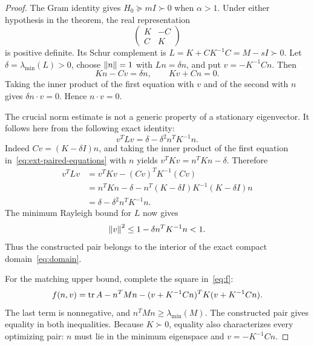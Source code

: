 \begin{proof}
The Gram identity gives $H_0\succeq mI\succ0$ when $\alpha>1$.
Under either hypothesis in the theorem, the real representation
\[
 \begin{pmatrix}K&-C\\ C&K\end{pmatrix}
\]
is positive definite. Its Schur complement is
$L=K+CK^{-1}C=M-sI\succ0$. Let
$\delta=\lambda_{\min}(L)>0$, choose $\left\lVert n\right\rVert=1$ with $Ln=\delta n$,
and put $v=-K^{-1}Cn$. Then
\begin{equation}
 Kn-Cv=\delta n,\qquad Kv+Cn=0.
 \label{eq:ext-paired-equations}
\end{equation}
Taking the inner product of the first equation with $v$ and of the
second with $n$ gives $\delta n\cdot v=0$. Hence $n\cdot v=0$.

The crucial norm estimate is not a generic property of a stationary
eigenvector. It follows here from the following exact identity:
\begin{equation}
 \boxed{\,v^TLv=\delta-\delta^2n^TK^{-1}n.\,}
 \label{eq:ext-rayleigh-identity}
\end{equation}
Indeed $Cv=(K-\delta I)n$, and taking the inner product of the
first equation in~\eqref{eq:ext-paired-equations} with $n$ yields
$v^TKv=n^TKn-\delta$. Therefore
\begin{align*}
 v^TLv
 &=v^TKv-(Cv)^TK^{-1}(Cv)\\
 &=n^TKn-\delta
   -n^T(K-\delta I)K^{-1}(K-\delta I)n\\
 &=\delta-\delta^2n^TK^{-1}n.
\end{align*}
The minimum Rayleigh bound for $L$ now gives
\begin{equation}
 \left\lVert v\right\rVert^2\le1-\delta n^TK^{-1}n<1.
 \label{eq:ext-feasible-margin}
\end{equation}
Thus the constructed pair belongs to the interior of the exact compact
domain~\eqref{eq:domain}.

For the matching upper bound, complete the square in~\eqref{eq:f}:
\begin{equation}
 f(n,v)=\operatorname{tr} A-n^TMn
 -(v+K^{-1}Cn)^TK(v+K^{-1}Cn).
 \label{eq:ext-square-completion}
\end{equation}
The last term is nonnegative, and $n^TMn\ge\lambda_{\min}(M)$.
The constructed pair gives equality in both inequalities. Because
$K\succ0$, equality also characterizes every optimizing pair: $n$
must lie in the minimum eigenspace and $v=-K^{-1}Cn$.
\end{proof}

